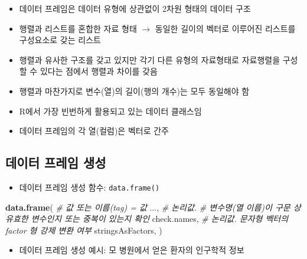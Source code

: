 \documentclass[
  11pt,
]{krantz}
\newenvironment{Shaded}{\begin{snugshade}}{\end{snugshade}}
\newcommand{\CommentTok}[1]{\textcolor[rgb]{0.37,0.37,0.37}{\textit{#1}}}
\newcommand{\KeywordTok}[1]{\textcolor[rgb]{0.27,0.27,0.27}{\textbf{#1}}}
\newcommand{\NormalTok}[1]{#1}
\providecommand{\tightlist}{%
  \setlength{\itemsep}{0pt}\setlength{\parskip}{0pt}}
\begin{document}
\normalsize

\begin{itemize}
\tightlist
\item
  데이터 프레임은 데이터 유형에 상관없이 2차원 형태의 데이터 구조
\item
  행렬과 리스트를 혼합한 자료 형태 \(\rightarrow\) 동일한 길이의 벡터로 이루어진 리스트를 구성요소로 갖는 리스트
\item
  행렬과 유사한 구조를 갖고 있지만 각기 다른 유형의 자료형태로 자료행렬을 구성할 수 있다는 점에서 행렬과 차이를 갖음
\item
  행렬과 마찬가지로 변수(열)의 길이(행의 개수)는 모두 동일해야 함
\item
  R에서 가장 빈번하게 활용되고 있는 데이터 클래스임
\item
  데이터 프레임의 각 열(컬럼)은 벡터로 간주
\end{itemize}

\hypertarget{create-data-frame}{%
\subsection{데이터 프레임 생성}\label{create-data-frame}}

\begin{itemize}
\tightlist
\item
  데이터 프레임 생성 함수: \texttt{data.frame()}
\end{itemize}

\footnotesize

\begin{Shaded}
\begin{Highlighting}[]
\KeywordTok{data.frame}\NormalTok{(}
  \CommentTok{# 값 또는 이름(tag) = 값}
\NormalTok{  ..., }
  \CommentTok{# 논리값. }
  \CommentTok{# 변수명(열 이름)이 구문 상 유효한 변수인지 또는 중복이 있는지 확인}
\NormalTok{  check.names, }
  \CommentTok{# 논리값. 문자형 벡터의 factor 형 강제 변환 여부 }
\NormalTok{  stringsAsFactors, }
\NormalTok{)}
\end{Highlighting}
\end{Shaded}

\normalsize

\begin{itemize}
\tightlist
\item
  데이터 프레임 생성 예시: 모 병원에서 얻은 환자의 인구학적 정보
\end{itemize}

\footnotesize
\end{document}
